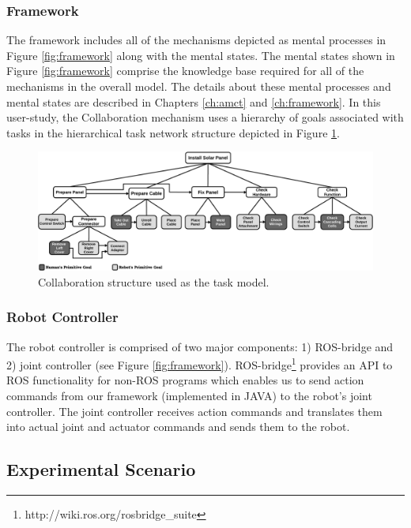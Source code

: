 \documentclass[12pt]{report}
\begin{document}
\subsubsection{Framework}
\label{sec:theory}
The framework includes all of the mechanisms depicted as mental processes in
Figure \ref{fig:framework} along with the mental states. The mental
states shown in Figure \ref{fig:framework} comprise the knowledge base required
for all of the mechanisms in the overall model. The details about these mental
processes and mental states are described in Chapters \ref{ch:amct} and
\ref{ch:framework}. In this user-study, the Collaboration mechanism uses a
hierarchy of goals associated with tasks in the hierarchical task network
structure depicted in Figure \ref{fig:collaboration_structure}.

\begin{figure}[tbh]
  \centering
  \includegraphics[width=1\textwidth]{figure/collaborationStructure.pdf}
  \caption{Collaboration structure used as the task model.}
  \label{fig:collaboration_structure}
\end{figure}

\subsubsection{Robot Controller}
The robot controller is comprised of two major components: 1) ROS-bridge and 2)
joint controller (see Figure \ref{fig:framework}).
ROS-bridge\footnote{http://wiki.ros.org/rosbridge\_suite} provides an API to ROS
functionality for non-ROS programs which enables us to send action commands from
our framework (implemented in JAVA) to the robot's joint controller. The joint
controller receives action commands and translates them into actual joint and
actuator commands and sends them to the robot.

\subsection{Experimental Scenario}
\end{document}
